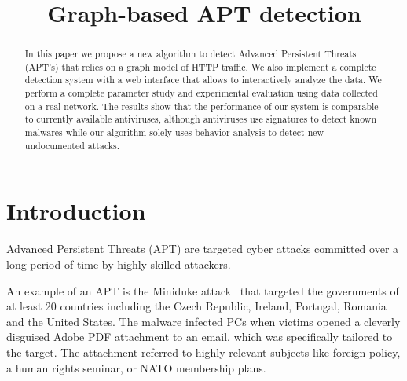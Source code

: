 \documentclass[conference]{IEEEtran}
\begin{document}
\title{Graph-based APT detection}

\author{
  \and
  \and
}


\IEEEoverridecommandlockouts{}



\maketitle

\begin{abstract}
In this paper we propose a new algorithm to detect Advanced Persistent Threats (APT's) that relies on a graph model of HTTP traffic. We also implement a complete detection system with a web interface that allows to interactively analyze the data. We perform a complete parameter study and experimental evaluation using data collected on a real network. The results show that the performance of our system is comparable to currently available antiviruses, although antiviruses use signatures to detect known malwares while our algorithm solely uses behavior analysis to detect new undocumented attacks.
\end{abstract}

\section{Introduction}

Advanced Persistent Threats (APT) are targeted cyber
attacks committed over a long period of time by highly
skilled attackers.

An example of an APT is the Miniduke attack~\cite{miniduke} that
targeted the governments of at least 20 countries including
the Czech Republic, Ireland, Portugal, Romania and the United States. The malware 
infected PCs when victims opened a cleverly
disguised Adobe PDF attachment to an email, which
was specifically tailored to the target. The attachment
referred to highly relevant subjects like foreign policy,
a human rights seminar, or NATO membership plans.
\end{document}
